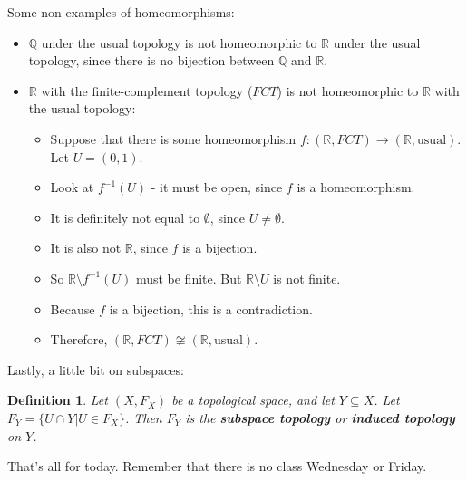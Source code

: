 \documentclass[11pt]{amsart}
\newtheorem*{defn}{Definition}
\newcommand{\R}{\mathbb R}
\begin{document}
Some non-examples of homeomorphisms:
\begin{itemize}
\item $\mathbb Q$ under the usual topology is not homeomorphic to $\R$ under the usual topology, since there is no bijection between $\mathbb Q$ and $\R$.
\item $\R$ with the finite-complement topology ($FCT$) is not homeomorphic to $\R$ with the usual topology:
\begin{itemize}
\item Suppose that there is some homeomorphism $f:(\R, FCT)\to(\R,\text{usual})$.  Let $U = (0,1)$.
\item Look at $f^{-1}(U)$ - it must be open, since $f$ is a homeomorphism.
\item It is definitely not equal to $\emptyset$, since $U\ne\emptyset$.
\item It is also not $\R$, since $f$ is a bijection.
\item So $\R\setminus f^{-1}(U)$ must be finite.  But $\R\setminus U$ is not finite.
\item Because $f$ is a bijection, this is a contradiction.
\item Therefore, $(\R, FCT) \not\cong (\R, \text{usual})$.
\end{itemize}
\end{itemize}
\pagebreak
Lastly, a little bit on subspaces: 

\begin{defn}
Let $(X, F_X)$ be a topological space, and let $Y\subseteq X$.  Let $F_Y = \{U \cap Y | U\in F_X\}$.  Then $F_Y$ is the {\bf subspace topology} or {\bf induced topology} on $Y$.
\end{defn}

That's all for today.  Remember that there is no class Wednesday or Friday.
\end{document}
